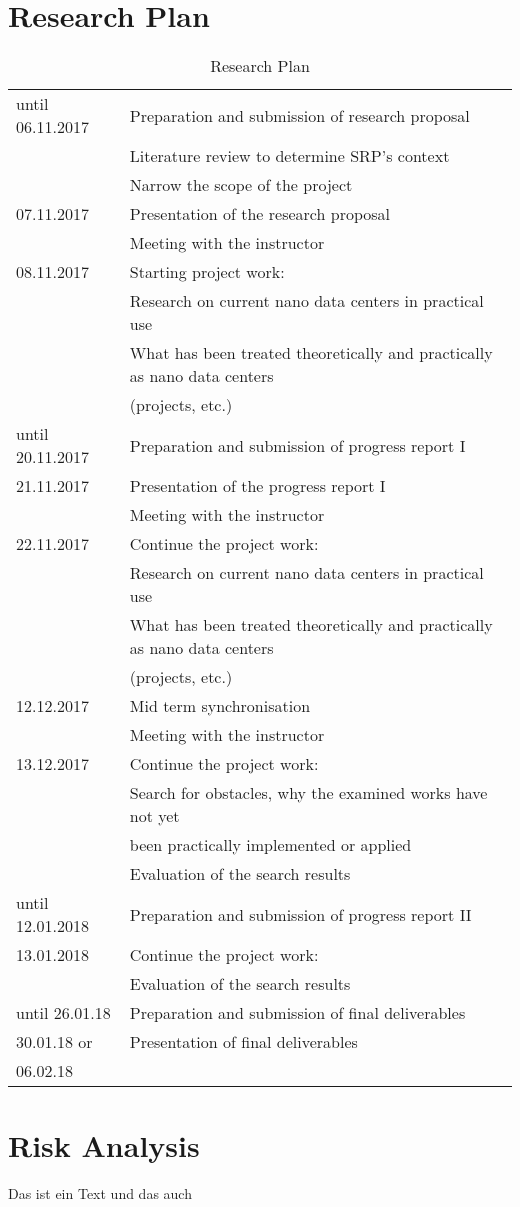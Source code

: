 \documentclass[sigchi-a, authorversion]{acmart}
\begin{document}
\section{Research Plan} %
\begin{table}[H]
  \caption{Research Plan}
  \label{tab:researchPlan}
  \begin{tabular}{ll}
    \toprule
    until 06.11.2017 & Preparation and submission of research proposal \\
    & Literature review to determine SRP's context \\
    & Narrow the scope of the project \\
    \hline
    07.11.2017 & Presentation of the research proposal \\
    & Meeting with the instructor \\
    \hline
    08.11.2017 & Starting project work: \\
    & Research on current nano data centers in practical use \\
    & What has been treated theoretically and practically as nano data centers \\
    & (projects, etc.) \\
    \hline
    until 20.11.2017 & Preparation and submission of progress report I \\
    \hline
    21.11.2017 & Presentation of the progress report I \\
    & Meeting with the instructor \\
    \hline
    22.11.2017 & Continue the project work: \\
    & Research on current nano data centers in practical use \\
    & What has been treated theoretically and practically as nano data centers \\
    & (projects, etc.) \\
    \hline
    12.12.2017 & Mid term synchronisation \\
    & Meeting with the instructor \\
    \hline
    13.12.2017 & Continue the project work: \\
    & Search for obstacles, why the examined works have not yet \\
    & been practically implemented or applied\\
    & Evaluation of the search results \\
    \hline
    until 12.01.2018 & Preparation and submission of progress report II \\
    \hline
    13.01.2018 & Continue the project work: \\
    & Evaluation of the search results \\
    \hline
    until 26.01.18 & Preparation and submission of final deliverables \\
    \hline
    30.01.18 or & Presentation of final deliverables \\
    06.02.18 &  \\
    \bottomrule
  \end{tabular}
\end{table}

\section{Risk Analysis} %
Das ist ein Text \cite{DBLP:conf/conext/ValanciusLMDR09} und das auch \cite{DBLP:journals/sigmetrics/JalaliAVHAT14}



\end{document}
